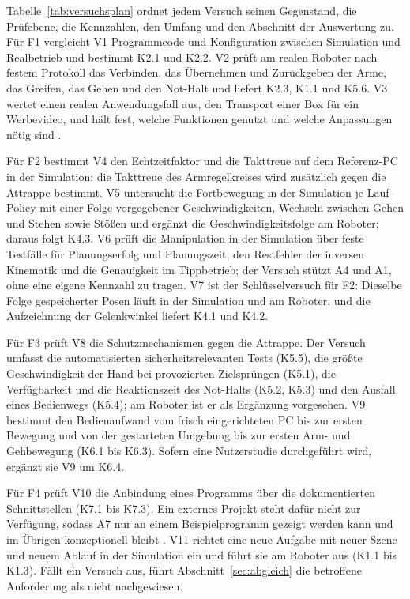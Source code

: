 Tabelle~\ref{tab:versuchsplan} ordnet jedem Versuch seinen Gegenstand, die Prüfebene, die Kennzahlen, den Umfang und den Abschnitt der Auswertung zu.
Für F1 vergleicht V1 Programmcode und Konfiguration zwischen Simulation und Realbetrieb und bestimmt K2.1 und K2.2.
V2 prüft am realen Roboter nach festem Protokoll das Verbinden, das Übernehmen und Zurückgeben der Arme, das Greifen, das Gehen und den Not-Halt und liefert K2.3, K1.1 und K5.6.
V3 wertet einen realen Anwendungsfall aus, den Transport einer Box für ein Werbevideo, und hält fest, welche Funktionen genutzt und welche Anpassungen nötig sind .

Für F2 bestimmt V4 den Echtzeitfaktor und die Takttreue auf dem Referenz-PC in der Simulation; die Takttreue des Armregelkreises wird zusätzlich gegen die Attrappe bestimmt.
V5 untersucht die Fortbewegung in der Simulation je Lauf-Policy mit einer Folge vorgegebener Geschwindigkeiten, Wechseln zwischen Gehen und Stehen sowie Stößen und ergänzt die Geschwindigkeitsfolge am Roboter; daraus folgt K4.3.
V6 prüft die Manipulation in der Simulation über feste Testfälle für Planungserfolg und Planungszeit, den Restfehler der inversen Kinematik und die Genauigkeit im Tippbetrieb; der Versuch stützt A4 und A1, ohne eine eigene Kennzahl zu tragen.
V7 ist der Schlüsselversuch für F2: Dieselbe Folge gespeicherter Posen läuft in der Simulation und am Roboter, und die Aufzeichnung der Gelenkwinkel liefert K4.1 und K4.2.

Für F3 prüft V8 die Schutzmechanismen gegen die Attrappe.
Der Versuch umfasst die automatisierten sicherheitsrelevanten Tests (K5.5), die größte Geschwindigkeit der Hand bei provozierten Zielsprüngen (K5.1), die Verfügbarkeit und die Reaktionszeit des Not-Halts (K5.2, K5.3) und den Ausfall eines Bedienwegs (K5.4); am Roboter ist er als Ergänzung vorgesehen.
V9 bestimmt den Bedienaufwand vom frisch eingerichteten PC bis zur ersten Bewegung und von der gestarteten Umgebung bis zur ersten Arm- und Gehbewegung (K6.1 bis K6.3).
Sofern eine Nutzerstudie durchgeführt wird, ergänzt sie V9 um K6.4.

Für F4 prüft V10 die Anbindung eines Programms über die dokumentierten Schnittstellen (K7.1 bis K7.3).
Ein externes Projekt steht dafür nicht zur Verfügung, sodass A7 nur an einem Beispielprogramm gezeigt werden kann und im Übrigen konzeptionell bleibt .
V11 richtet eine neue Aufgabe mit neuer Szene und neuem Ablauf in der Simulation ein und führt sie am Roboter aus (K1.1 bis K1.3).
Fällt ein Versuch aus, führt Abschnitt~\ref{sec:abgleich} die betroffene Anforderung als nicht nachgewiesen.

